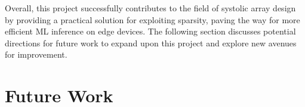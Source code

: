 \documentclass[12pt, a4paper, ukenglish]{article}
\begin{document}
    Overall, this project successfully contributes to the field of systolic array design by providing a practical solution for exploiting sparsity, paving the way for more efficient ML inference on edge devices. The following section discusses potential directions for future work to expand upon this project and explore new avenues for improvement.


\section{Future Work} \label{sec: future work}


\end{document}
